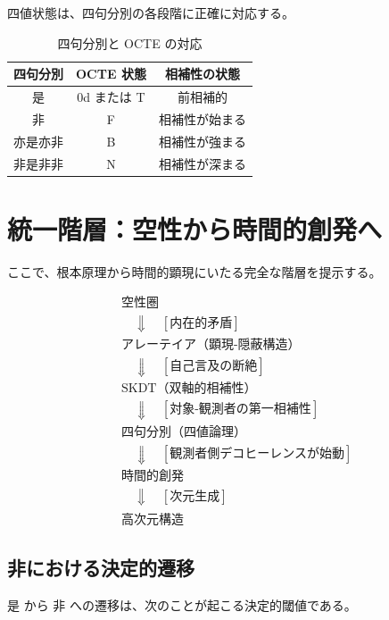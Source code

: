 \documentclass[12pt,a4paper]{article}
\theoremstyle{definition}
\begin{document}
四値状態は、四句分別の各段階に正確に対応する。

\begin{table}[htbp]
\centering
\begin{tabular}{|c|c|c|}
\hline
\textbf{四句分別} & \textbf{OCTE 状態} & \textbf{相補性の状態} \\
\hline
是 & 0d または T & 前相補的 \\
\hline
非 & F & 相補性が始まる \\
\hline
亦是亦非 & B & 相補性が強まる \\
\hline
非是非非 & N & 相補性が深まる \\
\hline
\end{tabular}
\caption{四句分別と OCTE の対応}
\end{table}

\section{統一階層：空性から時間的創発へ}

ここで、根本原理から時間的顕現にいたる完全な階層を提示する。

\begin{equation}
\begin{aligned}
&\text{空性圏} \\
&\quad \Downarrow \quad [\text{内在的矛盾}] \\
&\text{アレーテイア（顕現-隠蔽構造）} \\
&\quad \Downarrow \quad [\text{自己言及の断絶}] \\
&\text{SKDT（双軸的相補性）} \\
&\quad \Downarrow \quad [\text{対象-観測者の第一相補性}] \\
&\text{四句分別（四値論理）} \\
&\quad \Downarrow \quad [\text{観測者側デコヒーレンスが始動}] \\
&\text{時間的創発} \\
&\quad \Downarrow \quad [\text{次元生成}] \\
&\text{高次元構造}
\end{aligned}
\end{equation}

\subsection{非における決定的遷移}

是 から 非 への遷移は、次のことが起こる決定的閾値である。
\end{document}
